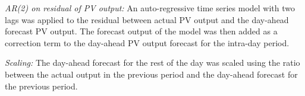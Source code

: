 \textit{AR(2) on residual of PV output:}
An auto-regressive time series model with two lags was applied to the residual between actual PV output and the day-ahead forecast PV output. The forecast output of the model was then added as a correction term to the day-ahead PV output forecast for the intra-day period.


\begin{removal}
\end{removal}

\textit{Scaling:}
The day-ahead forecast for the rest of the day was scaled using the ratio between the actual output in the previous period and the day-ahead forecast for the previous period.

